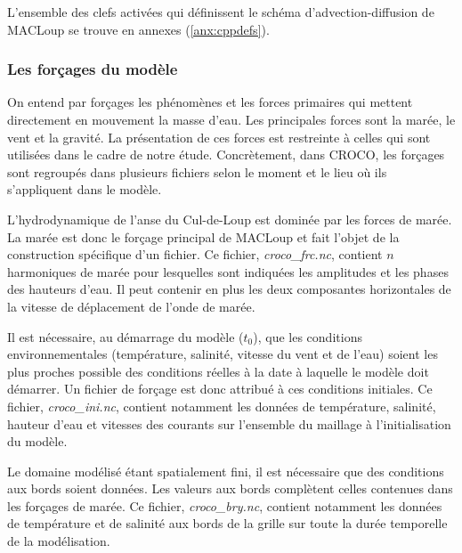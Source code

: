 \documentclass[10pt,a4paper,titlepage]{article}
\begin{document}
L'ensemble des clefs activées qui définissent le schéma d'advection-diffusion de MACLoup se trouve en annexes (\ref{anx:cppdefs}).


\subsubsection{Les forçages du modèle}
\label{subsub:forcages}
On entend par forçages les phénomènes et les forces primaires qui mettent directement en mouvement la masse d'eau.
Les principales forces sont la marée, le vent et la gravité.
La présentation de ces forces est restreinte à celles qui sont utilisées dans le cadre de notre étude.
Concrètement, dans CROCO, les forçages sont regroupés dans plusieurs fichiers selon le moment et le lieu où ils s'appliquent dans le modèle.

L'hydrodynamique de l'anse du Cul-de-Loup est dominée par les forces de marée.
La marée est donc le forçage principal de MACLoup et fait l'objet de la construction spécifique d'un fichier.
Ce fichier, \textit{croco\_frc.nc}, contient $n$ harmoniques de marée pour lesquelles sont indiquées les amplitudes et les phases des hauteurs d'eau. Il peut contenir en plus les deux composantes horizontales de la vitesse de déplacement de l'onde de marée.

Il est nécessaire, au démarrage du modèle ($t_0$), que les conditions environnementales (température, salinité, vitesse du vent et de l'eau) soient les plus proches possible des conditions réelles à la date à laquelle le modèle doit démarrer.
Un fichier de forçage est donc attribué à ces conditions initiales.
Ce fichier, \textit{croco\_ini.nc}, contient notamment les données de température, salinité, hauteur d'eau et vitesses des courants sur l'ensemble du maillage à l'initialisation du modèle.

Le domaine modélisé étant spatialement fini, il est nécessaire que des conditions aux bords soient données.
Les valeurs aux bords complètent celles contenues dans les forçages de marée.
Ce fichier, \textit{croco\_bry.nc}, contient notamment les données de température et de salinité %
aux bords de la grille sur toute la durée temporelle de la modélisation.
\end{document}
